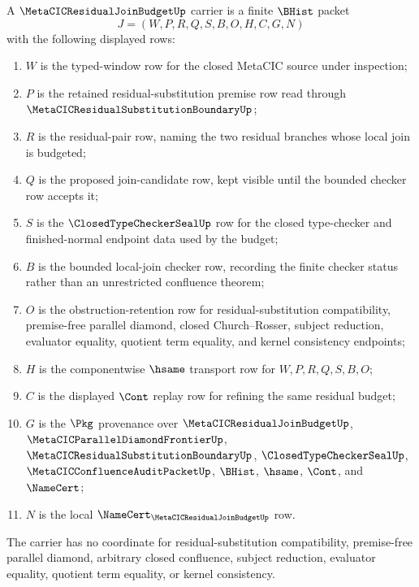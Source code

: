 \begin{definition}
\label{def:metacic-residual-join-budget-carrier}
A $\MetaCICResidualJoinBudgetUp$ carrier is a finite $\BHist$ packet
$$
J=(W,P,R,Q,S,B,O,H,C,G,N)
$$
with the following displayed rows:
\begin{enumerate}
\item $W$ is the typed-window row for the closed MetaCIC source under inspection;
\item $P$ is the retained residual-substitution premise row read through $\MetaCICResidualSubstitutionBoundaryUp$;
\item $R$ is the residual-pair row, naming the two residual branches whose local join is budgeted;
\item $Q$ is the proposed join-candidate row, kept visible until the bounded checker row accepts it;
\item $S$ is the $\ClosedTypeCheckerSealUp$ row for the closed type-checker and finished-normal endpoint data used by the budget;
\item $B$ is the bounded local-join checker row, recording the finite checker status rather than an unrestricted confluence theorem;
\item $O$ is the obstruction-retention row for residual-substitution compatibility, premise-free parallel diamond, closed Church--Rosser, subject reduction, evaluator equality, quotient term equality, and kernel consistency endpoints;
\item $H$ is the componentwise $\hsame$ transport row for $W,P,R,Q,S,B,O$;
\item $C$ is the displayed $\Cont$ replay row for refining the same residual budget;
\item $G$ is the $\Pkg$ provenance over $\MetaCICResidualJoinBudgetUp$, $\MetaCICParallelDiamondFrontierUp$, $\MetaCICResidualSubstitutionBoundaryUp$, $\ClosedTypeCheckerSealUp$, $\MetaCICConfluenceAuditPacketUp$, $\BHist$, $\hsame$, $\Cont$, and $\NameCert$;
\item $N$ is the local $\NameCert_{\MetaCICResidualJoinBudgetUp}$ row.
\end{enumerate}
The carrier has no coordinate for residual-substitution compatibility, premise-free parallel diamond, arbitrary closed confluence, subject reduction, evaluator equality, quotient term equality, or kernel consistency.
\end{definition}

